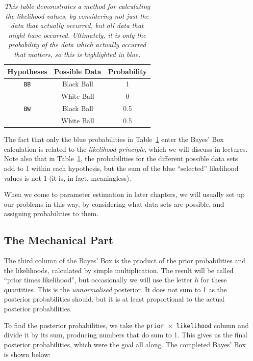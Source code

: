 \begin{table}[!ht]
\begin{center}
\begin{tabular}{|c|c|c|}
\hline
{\bf Hypotheses} & {\bf Possible Data} & {\bf Probability} \\
\hline
{\tt BB} & {\color{blue} Black Ball} & {\color{blue} 1}\\
         & White Ball & 0 \\
\hline
{\tt BW} & {\color{blue} Black Ball} & {\color{blue} 0.5} \\
         & White Ball & 0.5 \\
\hline
\end{tabular}
\caption{\it This table demonstrates a method for calculating the likelihood
values, by considering not just the data that actually occurred, but all
data that might have occurred. Ultimately, it is only the probability of the
data which actually occurred that matters, so this is highlighted in blue.
\label{tab:all_data}}
\end{center}
\end{table}
The fact that only the blue probabilities in Table~\ref{tab:all_data} enter the
Bayes' Box calculation is related to the {\it likelihood principle}, which we
will
discuss in lectures. Note also that in Table~\ref{tab:all_data}, the
probabilities for the different possible data sets add to 1 within each
hypothesis, but the sum of the blue ``selected'' likelihood values is not 1
(it is, in fact, meaningless).

When we come to parameter estimation in later chapters, we will usually set up
our problems in this way, by considering what data sets are possible, and
assigning probabilities to them.

\subsection{The Mechanical Part}
The third column of the Bayes' Box is the product of the prior probabilities
and the likelihoods, calculated by simple multiplication. The result will be
called ``prior times likelihood'', but occasionally we will use the letter $h$
for these quantities. This is the {\it unnormalised} posterior. It does not sum
to 1 as the posterior probabilities should, but it is at least proportional to
the actual posterior probabilities.

To find the posterior probabilities, we take the {\tt prior $\times$ likelihood}
column and divide it by its sum, producing numbers that do sum to 1. This
gives us the final
posterior probabilities, which were the goal all along. The completed Bayes'
Box is shown below:

